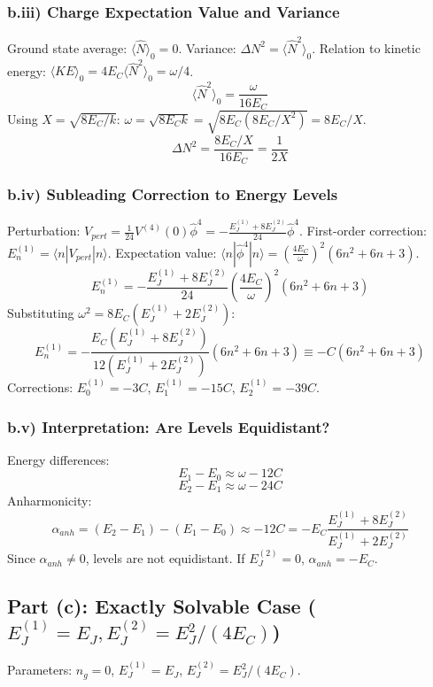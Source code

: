 \documentclass[12pt]{article}
\begin{document}
\begin{appendices}
\subsubsection*{b.iii) Charge Expectation Value and Variance}
\label{app:part_b:subsubsec_iii}
Ground state average: $\langle \hat{N} \rangle_0 = 0$.
Variance: $\Delta N^2 = \langle \hat{N}^2 \rangle_0$.
Relation to kinetic energy: $\langle KE \rangle_0 = 4 E_C \langle \hat{N}^2 \rangle_0 = \omega/4$.
\[ \langle \hat{N}^2 \rangle_0 = \frac{\omega}{16 E_C} \]
Using $X = \sqrt{8 E_C / k}$: $\omega = \sqrt{8 E_C k} = \sqrt{8 E_C (8E_C/X^2)} = 8E_C/X$.
\[ \Delta N^2 = \frac{8E_C/X}{16 E_C} = \frac{1}{2X} \]

\subsubsection*{b.iv) Subleading Correction to Energy Levels}
\label{app:part_b:subsubsec_iv}
Perturbation: $V_{pert} = \frac{1}{24}V^{(4)}(0) \hat{\phi}^4 = -\frac{E_J^{(1)} + 8 E_J^{(2)}}{24} \hat{\phi}^4$.
First-order correction: $E_n^{(1)} = \langle n | V_{pert} | n \rangle$.
Expectation value: $\langle n | \hat{\phi}^4 | n \rangle = (\frac{4E_C}{\omega})^2 (6n^2 + 6n + 3)$.
\[ E_n^{(1)} = -\frac{E_J^{(1)} + 8 E_J^{(2)}}{24} \left(\frac{4E_C}{\omega}\right)^2 (6n^2 + 6n + 3) \]
Substituting $\omega^2 = 8 E_C (E_J^{(1)} + 2 E_J^{(2)})$:
\[ E_n^{(1)} = -\frac{E_C (E_J^{(1)} + 8 E_J^{(2)})}{12 (E_J^{(1)} + 2 E_J^{(2)})} (6n^2 + 6n + 3) \equiv - C (6n^2 + 6n + 3) \]
Corrections: $E_0^{(1)} = -3C$, $E_1^{(1)} = -15C$, $E_2^{(1)} = -39C$.

\subsubsection*{b.v) Interpretation: Are Levels Equidistant?}
\label{app:part_b:subsubsec_v}
Energy differences:
\[ E_1 - E_0 \approx \omega - 12C \]
\[ E_2 - E_1 \approx \omega - 24C \]
Anharmonicity:
\[ \alpha_{anh} = (E_2 - E_1) - (E_1 - E_0) \approx -12C = - E_C \frac{E_J^{(1)} + 8 E_J^{(2)}}{E_J^{(1)} + 2 E_J^{(2)}} \]
Since $\alpha_{anh} \neq 0$, levels are not equidistant. If $E_J^{(2)}=0$, $\alpha_{anh} = -E_C$.

\subsection[Part (c): Exactly Solvable Case]{Part (c): Exactly Solvable Case ($E_J^{(1)}=E_J, E_J^{(2)}=E_J^2/(4E_C)$)}
\label{app:part_c}
Parameters: $n_g = 0$, $E_J^{(1)}=E_J$, $E_J^{(2)}=E_J^2/(4E_C)$.


\end{appendices}
\end{document}
